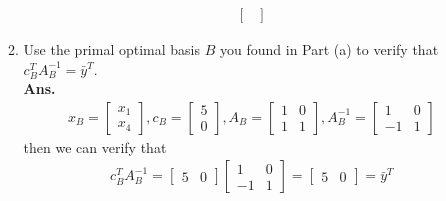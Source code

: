 \documentclass[12pt]{article}
\begin{document}
\begin{enumerate}
\begin{enumerate}
\begin{align*}
\begin{bmatrix}
                                                                                                    \end{bmatrix}
                        \end{align*}
                  \item Use the primal optimal basis $B$ you found in Part (a) to verify that $c^T_BA^{-1}_B = \bar{y}^{T}$.\\
                        \textbf{Ans.}
                        \begin{align*}
                              x_B = \begin{bmatrix}
                                          x_1 \\x_4
                                    \end{bmatrix},c_B = \begin{bmatrix}
                                                              5 \\ 0
                                                        \end{bmatrix},
                              A_B = \begin{bmatrix}
                                          1 & 0 \\1 & 1
                                    \end{bmatrix},A_B^{-1} = \begin{bmatrix}
                                                                   1 & 0 \\-1 & 1
                                                             \end{bmatrix}
                        \end{align*}
                        then we can verify that
                        \begin{align*}
                              c_B^TA_B^{-1} = \begin{bmatrix}
                                                    5 & 0
                                              \end{bmatrix}\begin{bmatrix}
                                                                 1 & 0 \\-1 & 1
                                                           \end{bmatrix} = \begin{bmatrix}
                                                                                 5 & 0
                                                                           \end{bmatrix} = \bar{y}^T

\end{align*}
\end{enumerate}
\end{enumerate}
\end{document}
